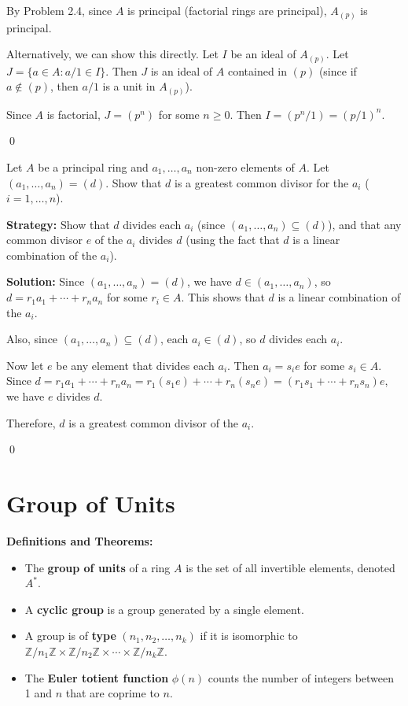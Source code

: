 By Problem 2.4, since $A$ is principal (factorial rings are principal), $A_{(p)}$ is principal.

Alternatively, we can show this directly. Let $I$ be an ideal of $A_{(p)}$. Let $J = \{a \in A : a/1 \in I\}$. Then $J$ is an ideal of $A$ contained in $(p)$ (since if $a \notin (p)$, then $a/1$ is a unit in $A_{(p)}$).

Since $A$ is factorial, $J = (p^n)$ for some $n \geq 0$. Then $I = (p^n/1) = (p/1)^n$.


\qed
\begin{problembox}
Let $A$ be a principal ring and $a_1, \ldots, a_n$ non-zero elements of $A$. Let $(a_1, \ldots, a_n) = (d)$. Show that $d$ is a greatest common divisor for the $a_i$ ($i = 1, \ldots, n$).
\end{problembox}

\noindent\textbf{Strategy:} Show that $d$ divides each $a_i$ (since $(a_1, \ldots, a_n) \subseteq (d)$), and that any common divisor $e$ of the $a_i$ divides $d$ (using the fact that $d$ is a linear combination of the $a_i$).

\noindent\textbf{Solution:}
Since $(a_1, \ldots, a_n) = (d)$, we have $d \in (a_1, \ldots, a_n)$, so $d = r_1a_1 + \cdots + r_na_n$ for some $r_i \in A$. This shows that $d$ is a linear combination of the $a_i$.

Also, since $(a_1, \ldots, a_n) \subseteq (d)$, each $a_i \in (d)$, so $d$ divides each $a_i$.

Now let $e$ be any element that divides each $a_i$. Then $a_i = s_i e$ for some $s_i \in A$. Since $d = r_1a_1 + \cdots + r_na_n = r_1(s_1e) + \cdots + r_n(s_ne) = (r_1s_1 + \cdots + r_ns_n)e$, we have $e$ divides $d$.

Therefore, $d$ is a greatest common divisor of the $a_i$.


\qed
\section{Group of Units}

\noindent\textbf{Definitions and Theorems:}
\begin{itemize}
\item The \textbf{group of units} of a ring $A$ is the set of all invertible elements, denoted $A^*$.
\item A \textbf{cyclic group} is a group generated by a single element.
\item A group is of \textbf{type} $(n_1, n_2, \ldots, n_k)$ if it is isomorphic to $\mathbb{Z}/n_1\mathbb{Z} \times \mathbb{Z}/n_2\mathbb{Z} \times \cdots \times \mathbb{Z}/n_k\mathbb{Z}$.
\item The \textbf{Euler totient function} $\phi(n)$ counts the number of integers between 1 and $n$ that are coprime to $n$.
\end{itemize}

